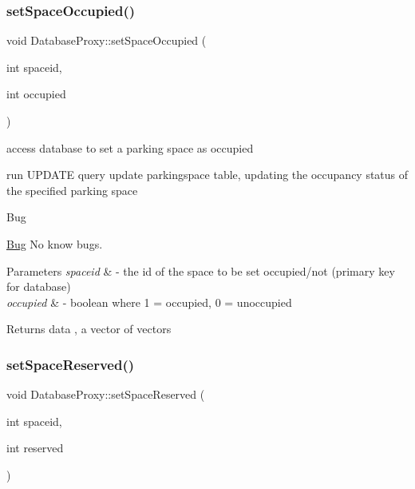 \subsubsection{\texorpdfstring{set\+Space\+Occupied()}{setSpaceOccupied()}}
{\footnotesize\ttfamily void Database\+Proxy\+::set\+Space\+Occupied (\begin{DoxyParamCaption}\item[{int}]{spaceid,  }\item[{int}]{occupied }\end{DoxyParamCaption})}



access database to set a parking space as occupied 

run U\+P\+D\+A\+TE query update parkingspace table, updating the occupancy status of the specified parking space

\begin{DoxyRefDesc}{Bug}
\item[\mbox{\hyperlink{bug__bug000015}{Bug}}]No know bugs. \end{DoxyRefDesc}

\begin{DoxyParams}{Parameters}
{\em spaceid} & -\/ the id of the space to be set occupied/not (primary key for database) \\
\hline
{\em occupied} & -\/ boolean where 1 = occupied, 0 = unoccupied \\
\hline
\end{DoxyParams}
\begin{DoxyReturn}{Returns}
data , a vector of vectors 
\end{DoxyReturn}
\mbox{\label{class_database_proxy_ade2171b0f8da996d516a212692913d59}} 
\subsubsection{\texorpdfstring{set\+Space\+Reserved()}{setSpaceReserved()}}
{\footnotesize\ttfamily void Database\+Proxy\+::set\+Space\+Reserved (\begin{DoxyParamCaption}\item[{int}]{spaceid,  }\item[{int}]{reserved }\end{DoxyParamCaption})}




